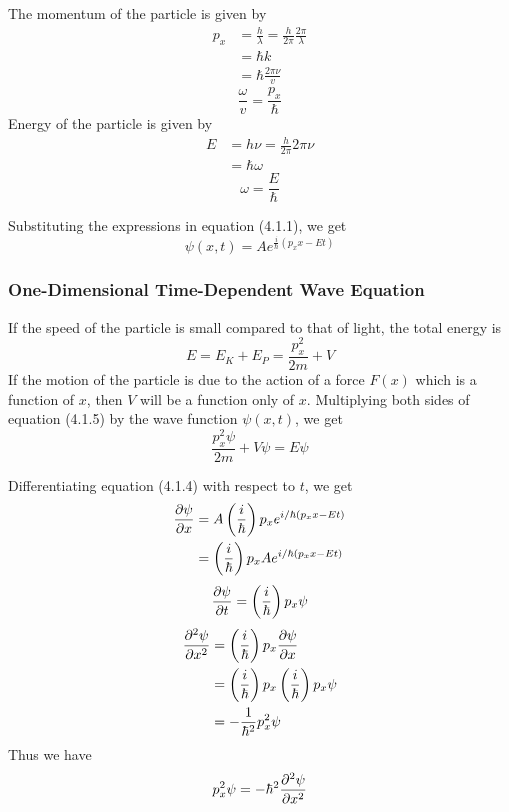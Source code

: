 \documentclass[12pt]{article}
\numberwithin{equation}{subsection}
\begin{document}
The momentum of the particle is given by
\begin{align*}
    p_x &= \frac{h}{\lambda} = \frac{h}{2\pi}\frac{2\pi}{\lambda} \\
    &= \hbar k \\
    &= \hbar \frac{2\pi\nu}{v}
\end{align*}
\begin{equation}
    \frac{\omega}{v} = \frac{p_x}{\hbar}
\end{equation}
Energy of the particle is given by
\begin{align*}
    E &= h\nu = \frac{h}{2\pi}2\pi\nu \\
    &= \hbar \omega
\end{align*}
\begin{equation}
    \omega = \frac{E}{\hbar}
\end{equation}

Substituting the expressions in equation (4.1.1), we get
\begin{equation}
    \boxed{ \psi(x, t) = A e^{\frac{i}{\hbar}\left( p_{x}x - Et \right)} }
\end{equation}

\subsubsection{One-Dimensional Time-Dependent Wave Equation}
If the speed of the particle is small compared to that of light, the total energy is
\begin{equation}
    E = E_K + E_P = \frac{p_{x}^2}{2m} + V
\end{equation}
If the motion of the particle is due to the action of a force $F(x)$ which is a function of $x$, then $V$ will be a function only of $x$. Multiplying both sides of equation (4.1.5) by the wave function $\psi(x,t)$, we get
\begin{equation}
    \frac{p_x^2 \psi}{2m} + V\psi = E\psi
\end{equation}

Differentiating equation (4.1.4) with respect to $t$, we get
\begin{align*}
    \pdv{\psi}{x} &= A \left( \frac{i}{\hbar} \right)p_x e^{i/\hbar (p_x x - Et)} \\
    &= \left( \frac{i}{\hbar} \right) p_x A e^{i/\hbar (p_x x - Et)}
\end{align*}
\begin{equation}
    \pdv{\psi}{t} = \left( \frac{i}{\hbar} \right) p_x \psi
\end{equation}
\begin{align*}
    \pdv[2]{\psi}{x} &= \left( \frac{i}{\hbar} \right) p_x \pdv{\psi}{x} \\
    &= \left( \frac{i}{\hbar} \right) p_x \left( \frac{i}{\hbar} \right) p_x \psi \\
    &= -\frac{1}{\hbar^2} p_x^2 \psi
\end{align*}
Thus we have
\begin{equation}
    p_{x}^2 \psi = -\hbar^2 \pdv[2]{\psi}{x}
\end{equation}\\~\\
\end{document}

